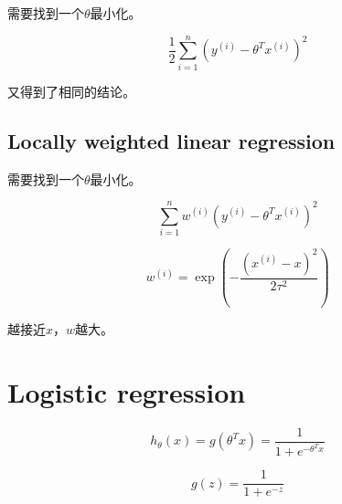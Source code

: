 \documentclass[letterpaper,11pt]{article}
\begin{document}
\begin{CJK}{UTF8}{gbsn}
需要找到一个$\theta$最小化。

$$\frac{1}{2} \sum_{i=1}^n(y^{(i)} - \theta^T x^{(i)})^2$$

又得到了相同的结论。

\subsection{Locally weighted linear regression}

需要找到一个$\theta$最小化。

$$\sum_{i=1}^n w^{(i)} (y^{(i)} - \theta^T x^{(i)})^2$$

$$w^{(i)}=\exp \left(-\frac{(x^{(i)}-x)^2}{2\tau^2}\right)$$

越接近$x$，$w$越大。

\section{Logistic regression}

$$h_\theta(x)=g(\theta^Tx)=\frac{1}{1+e^{-\theta^T x}}$$

$$g(z)=\frac{1}{1+e^{-z}}$$

\end{CJK}
\end{document}
